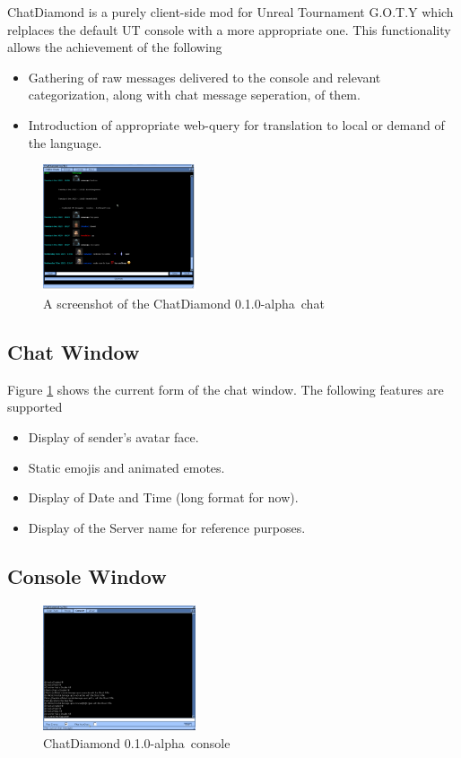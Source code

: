 \documentclass{article}
\newcommand{\ChatDiamondVersion}{0.1.0-alpha}
\begin{document}
ChatDiamond is a purely client-side mod for Unreal Tournament G.O.T.Y which relplaces the default UT console with a more appropriate one.  This functionality allows the achievement of the following
\begin{itemize}
\item Gathering of raw messages delivered to the console and relevant categorization, along with chat message seperation, of them.
\item Introduction of appropriate web-query for translation to local or demand of the language.
\end{itemize}

\begin{figure}
\centering
\label{fig:chatdiamond}
\includegraphics[width=0.4\textwidth]{img}
\caption{A screenshot of the ChatDiamond \ChatDiamondVersion~chat}
\end{figure}

\subsection{Chat Window}
Figure \ref{fig:chatdiamond} shows the current form of the chat window. The following features are supported
\begin{itemize}
\item Display of sender's avatar face.
\item Static emojis and animated emotes.
\item Display of Date and Time (long format for now).
\item Display of the Server name for reference purposes.
\end{itemize}

\subsection{Console Window}
\begin{figure}
\centering
\label{fig:chatdiamond_console}
\includegraphics[width=0.4\textwidth]{img_console}
\caption{ChatDiamond \ChatDiamondVersion~console}
\end{figure}
\end{document}
